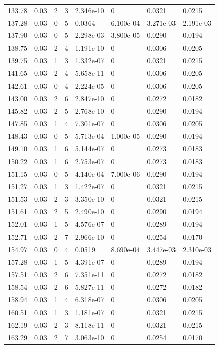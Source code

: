 \documentclass[preview]{standalone}
\begin{document}
{{{{\begin{tabular}{L{1.2cm}C{1.2cm} C{0.3cm}C{0.5cm} C{1.4cm}C{1.4cm} C{1.4cm}C{1.4cm}}
  133.78  &  0.03  & 2     &  3 &  2.346e-10  & 0  & 0.0321 &  0.0215   \\ 
  137.28  &  0.03  & 0     &  5 &  0.0364  & 6.100e-04  & 3.271e-03 &  2.191e-03   \\ 
  137.90  &  0.03  & 0     &  5 &  2.298e-03  & 3.800e-05  & 0.0290 &  0.0194   \\ 
  138.75  &  0.03  & 2     &  4 &  1.191e-10  & 0  & 0.0306 &  0.0205   \\ 
  139.75  &  0.03  & 1     &  3 &  1.332e-07  & 0  & 0.0321 &  0.0215   \\ 
  141.65  &  0.03  & 2     &  4 &  5.658e-11  & 0  & 0.0306 &  0.0205   \\ 
  142.61  &  0.03  & 0     &  4 &  2.224e-05  & 0  & 0.0306 &  0.0205   \\ 
  143.00  &  0.03  & 2     &  6 &  2.847e-10  & 0  & 0.0272 &  0.0182   \\ 
  145.82  &  0.03  & 2     &  5 &  2.768e-10  & 0  & 0.0290 &  0.0194   \\ 
  147.85  &  0.03  & 1     &  4 &  7.301e-07  & 0  & 0.0306 &  0.0205   \\ 
  148.43  &  0.03  & 0     &  5 &  5.713e-04  & 1.000e-05  & 0.0290 &  0.0194   \\ 
  149.10  &  0.03  & 1     &  6 &  5.144e-07  & 0  & 0.0273 &  0.0183   \\ 
  150.22  &  0.03  & 1     &  6 &  2.753e-07  & 0  & 0.0273 &  0.0183   \\ 
  151.15  &  0.03  & 0     &  5 &  4.140e-04  & 7.000e-06  & 0.0290 &  0.0194   \\ 
  151.27  &  0.03  & 1     &  3 &  1.422e-07  & 0  & 0.0321 &  0.0215   \\ 
  151.53  &  0.03  & 2     &  3 &  3.350e-10  & 0  & 0.0321 &  0.0215   \\ 
  151.61  &  0.03  & 2     &  5 &  2.490e-10  & 0  & 0.0290 &  0.0194   \\ 
  152.01  &  0.03  & 1     &  5 &  4.576e-07  & 0  & 0.0289 &  0.0194   \\ 
  152.71  &  0.03  & 2     &  7 &  2.966e-10  & 0  & 0.0254 &  0.0170   \\ 
  154.97  &  0.03  & 0     &  4 &  0.0519  & 8.690e-04  & 3.447e-03 &  2.310e-03   \\ 
  157.28  &  0.03  & 1     &  5 &  4.391e-07  & 0  & 0.0289 &  0.0194   \\ 
  157.51  &  0.03  & 2     &  6 &  7.351e-11  & 0  & 0.0272 &  0.0182   \\ 
  158.54  &  0.03  & 2     &  6 &  5.827e-11  & 0  & 0.0272 &  0.0182   \\ 
  158.94  &  0.03  & 1     &  4 &  6.318e-07  & 0  & 0.0306 &  0.0205   \\ 
  160.51  &  0.03  & 1     &  3 &  1.181e-07  & 0  & 0.0321 &  0.0215   \\ 
  162.19  &  0.03  & 2     &  3 &  8.118e-11  & 0  & 0.0321 &  0.0215   \\ 
  163.29  &  0.03  & 2     &  7 &  3.063e-10  & 0  & 0.0254 &  0.0170   \\ 
\hline 
\end{tabular} 

}}}}
\end{document}
